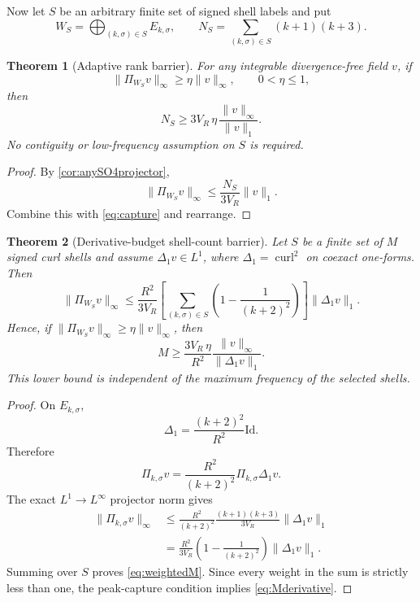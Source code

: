 \documentclass[
 aps,
 prd,
 reprint,
 amsmath,
 amssymb,
 nofootinbib,
 superscriptaddress
]{revtex4-2}
\newtheorem{theorem}{Theorem}[section]
\theoremstyle{definition}
\theoremstyle{remark}
\newcommand{\curl}{\operatorname{curl}}
\newcommand{\Id}{\mathrm{Id}}
\begin{document}
Now let $S$ be an arbitrary finite set of signed shell labels and put
\[
 W_S=\bigoplus_{(k,\sigma)\in S}E_{k,\sigma},
 \qquad
 N_S=\sum_{(k,\sigma)\in S}(k+1)(k+3).
\]

\begin{theorem}[Adaptive rank barrier]
\label{thm:adaptiverank}
For any integrable divergence-free field $v$,
if
\begin{equation}
 \|\Pi_{W_S}v\|_\infty\ge\eta\|v\|_\infty,
 \qquad 0<\eta\le1,
 \label{eq:capture}
\end{equation}
then
\begin{equation}
 \boxed{
 N_S\ge
 3V_R\,\eta\,\frac{\|v\|_\infty}{\|v\|_1}.
 }
 \label{eq:adaptiverank}
\end{equation}
No contiguity or low-frequency assumption on $S$ is required.
\end{theorem}

\begin{proof}
By \cref{cor:anySO4projector},
\[
 \|\Pi_{W_S}v\|_\infty
 \le
 \frac{N_S}{3V_R}\|v\|_1.
\]
Combine this with \eqref{eq:capture} and rearrange.
\end{proof}

\begin{theorem}[Derivative-budget shell-count barrier]
\label{thm:derivativeshell}
Let $S$ be a finite set of $M$ signed curl shells and assume
$\Delta_1 v\in L^1$, where $\Delta_1=\curl^2$ on coexact one-forms.
Then
\begin{equation}
 \boxed{
 \|\Pi_{W_S}v\|_\infty
 \le
 \frac{R^2}{3V_R}
 \left[
   \sum_{(k,\sigma)\in S}
   \left(1-\frac1{(k+2)^2}\right)
 \right]
 \|\Delta_1v\|_1.
 }
 \label{eq:weightedM}
\end{equation}
Hence, if
$\|\Pi_{W_S}v\|_\infty\ge\eta\|v\|_\infty$, then
\begin{equation}
 \boxed{
 M
 \ge
 \frac{3V_R\,\eta}{R^2}
 \frac{\|v\|_\infty}{\|\Delta_1v\|_1}.
 }
 \label{eq:Mderivative}
\end{equation}
This lower bound is independent of the maximum frequency of the selected shells.
\end{theorem}

\begin{proof}
On $E_{k,\sigma}$,
\[
 \Delta_1=\frac{(k+2)^2}{R^2}\Id.
\]
Therefore
\[
 \Pi_{k,\sigma}v
 =
 \frac{R^2}{(k+2)^2}\Pi_{k,\sigma}\Delta_1v.
\]
The exact $L^1\to L^\infty$ projector norm gives
\begin{align*}
 \|\Pi_{k,\sigma}v\|_\infty
 &\le
 \frac{R^2}{(k+2)^2}
 \frac{(k+1)(k+3)}{3V_R}
 \|\Delta_1v\|_1\\
 &=
 \frac{R^2}{3V_R}
 \left(1-\frac1{(k+2)^2}\right)
 \|\Delta_1v\|_1.
\end{align*}
Summing over $S$ proves \eqref{eq:weightedM}.  Since every weight in the
sum is strictly less than one, the peak-capture condition implies
\eqref{eq:Mderivative}.
\end{proof}
\end{document}

